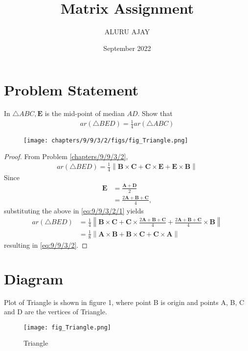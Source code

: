 \documentclass[journal,10pt,twocolumn]{article}
\title{\textbf{Matrix Assignment}}
\author{ALURU AJAY}
\date{September 2022}
\providecommand{\norm}[1]{\left\lVert#1\right\rVert}
\let\vec\mathbf
\begin{document}
\maketitle

\section{Problem Statement}
\fi
In $\triangle ABC, \vec{E}$ is the mid-point of median $AD$.
Show that 
\begin{align}
ar(\triangle BED) = \frac{1}{4} ar(\triangle ABC)
		\label{eq:9/9/3/2}
\end{align}
	\begin{figure}[H]
		\centering
 \texttt{[image: chapters/9/9/3/2/figs/fig\_Triangle.png]}
		\caption{}
		\label{fig:9/9/3/2}
  	\end{figure}
\begin{proof}
	From Problem 
\ref{chapters/9/9/3/2},
  \begin{align}
ar(\triangle BED) =
 \frac{1}{4}\norm{\vec{B} \times \vec{C}+\vec{C} \times \vec{E}+\vec{E} \times \vec{B}}
		\label{eq:9/9/3/2/1}
  \end{align}
  Since 
  \begin{align}
	  \vec{E} &= \frac{ \vec{A}+\vec{D}}{2}
	  \\
	  &= \frac{ 2\vec{A}+\vec{B} + \vec{C}}{4},
  \end{align}
  substituting the above in 
		\eqref{eq:9/9/3/2/1}
		yields
  \begin{align}
	  ar(\triangle BED) &=
 \frac{1}{4}\norm{\vec{B} \times \vec{C}+\vec{C} \times \frac{ 2\vec{A}+\vec{B} + \vec{C}}{4}+\frac{ 2\vec{A}+\vec{B} + \vec{C}}{4} \times \vec{B}}
 \\
	  &=\frac{1}{8}\norm{\vec{A} \times \vec{B}+\vec{B} \times \vec{C}+\vec{C} \times \vec{A}}
  \end{align}
  resulting in
		\eqref{eq:9/9/3/2}.
\end{proof}
\iffalse

\section{Diagram}
Plot of Triangle is shown in figure 1, where point B is origin and points A, B, C and D are the vertices of Triangle.
\begin{figure}[H]
\texttt{[image: fig\_Triangle.png]}
\caption{Triangle}
\label{fig:Triangle}
\end{figure}
\end{document}
